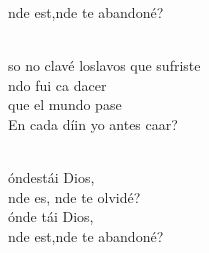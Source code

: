 \documentclass[12pt]{article}
\begin{document}
\begin{multicols*}{2}
\begin{cancion}
\begin{chorus}
	nde est,nde te abandoné?  \\
	\end{chorus}%
	\jump\\
	so no clavé loslavos que sufriste\\
	ndo fui ca dacer \\
que el mundo pase\\
	En  cada díin yo antes caar? \\\jump\\
	\begin{chorus}%
	óndestái Dios, \\
	nde es, nde te olvidé?  \\
	ónde tái Dios, \\
	nde est,nde te abandoné?  \\
	\end{chorus}%
	\jump\\
\end{cancion}%


\end{multicols*}
\end{document}
